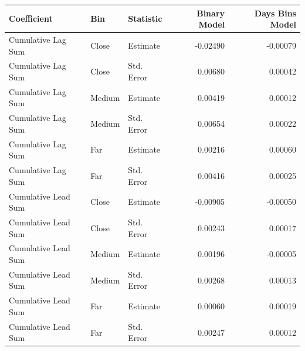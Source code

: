 \begin{table}[ht]
\centering
\begin{tabular}{lllrr}
  \toprule
Coefficient & Bin & Statistic & Binary Model & Days Bins Model \\ 
  \midrule
Cumulative Lag Sum & Close & Estimate & -0.02490 & -0.00079 \\ 
  Cumulative Lag Sum & Close & Std. Error & 0.00680 & 0.00042 \\ 
  Cumulative Lag Sum & Medium & Estimate & 0.00419 & 0.00012 \\ 
  Cumulative Lag Sum & Medium & Std. Error & 0.00654 & 0.00022 \\ 
  Cumulative Lag Sum & Far & Estimate & 0.00216 & 0.00060 \\ 
  Cumulative Lag Sum & Far & Std. Error & 0.00416 & 0.00025 \\ 
  Cumulative Lead Sum & Close & Estimate & -0.00905 & -0.00050 \\ 
  Cumulative Lead Sum & Close & Std. Error & 0.00243 & 0.00017 \\ 
  Cumulative Lead Sum & Medium & Estimate & 0.00196 & -0.00005 \\ 
  Cumulative Lead Sum & Medium & Std. Error & 0.00268 & 0.00013 \\ 
  Cumulative Lead Sum & Far & Estimate & 0.00060 & 0.00019 \\ 
  Cumulative Lead Sum & Far & Std. Error & 0.00247 & 0.00012 \\ 
   \bottomrule
\end{tabular}
\end{table}
